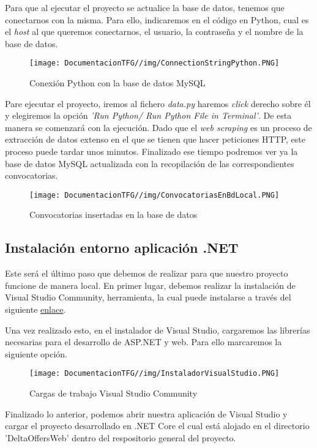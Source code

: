 Para que al ejecutar el proyecto se actualice la base de datos, tenemos que conectarnos con la misma. Para ello, indicaremos en el código en Python, cual es el \textit{host} al que queremos conectarnos, el usuario, la contraseña y el nombre de la base de datos.
\begin{figure}[H]
    \centering
    \texttt{[image: DocumentacionTFG//img/ConnectionStringPython.PNG]}
    \caption{Conexión Python con la base de datos MySQL}
\end{figure}


Pare ejecutar el proyecto, iremos al fichero \textit{data.py} haremos \textit{click} derecho sobre él y elegiremos la opción \textit{'Run Python/ Run Python File in Terminal'}. De esta manera se comenzará con la ejecución. Dado que el \textit{web scraping} es un proceso de extracción de datos extenso en el que se tienen que hacer peticiones HTTP, este proceso puede tardar unos minutos. Finalizado ese tiempo podremos ver ya la base de datos MySQL actualizada con la recopilación de las correspondientes convocatorias.

\begin{figure}[H]
    \centering
    \texttt{[image: DocumentacionTFG//img/ConvocatoriasEnBdLocal.PNG]}
    \caption{Convocatorias insertadas en la base de datos}
\end{figure}

\subsection{Instalación entorno aplicación .NET}
Este será el último paso que debemos de realizar para que nuestro proyecto funcione de manera local. En primer lugar, debemos realizar la instalación de Visual Studio Community, herramienta, la cual puede instalarse a través del siguiente \href{https://visualstudio.microsoft.com/es/vs/community/}{enlace}.

Una vez realizado esto, en el instalador de Visual Studio, cargaremos las librerías necesarias para el desarrollo de ASP.NET y web. Para ello marcaremos la siguiente opción.
\begin{figure}[H]
    \centering
    \texttt{[image: DocumentacionTFG//img/InstaladorVisualStudio.PNG]}
    \caption{Cargas de trabajo Visual Studio Community}
\end{figure}

Finalizado lo anterior, podemos abrir nuestra aplicación de Visual Studio y cargar el proyecto desarrollado en .NET Core el cual está alojado en el directorio 'DeltaOffersWeb' dentro del respositorio general del proyecto.


